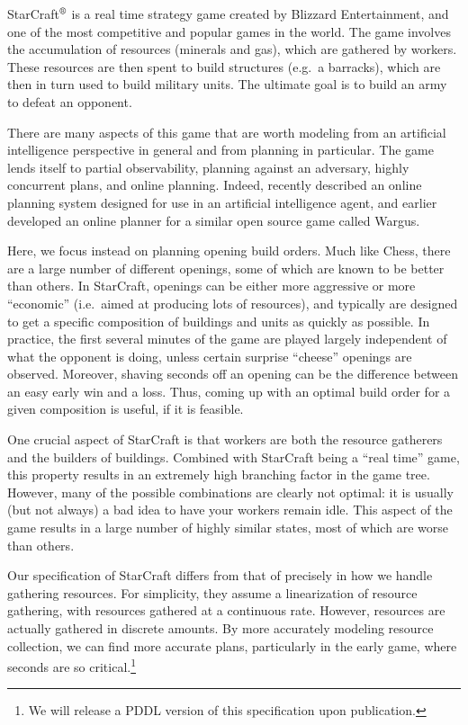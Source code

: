 \documentclass[letterpaper]{article}
\theoremstyle{plain} \newtheorem{theorem}{Theorem} \newtheorem{proposition}{Proposition} \newtheorem{lemma}{Lemma}
\theoremstyle{definition} \newtheorem{definition}{Definition} \newtheorem{conjecture}{Conjecture} \newtheorem*{example}{Example}
\theoremstyle{remark} \newtheorem*{remark}{Remark} \newtheorem*{note}{Note} \newtheorem{case}{Case}
\begin{document}
StarCraft$^\textrm{\textregistered}$ is a real time strategy game
created by Blizzard Entertainment, and one of the most competitive
and popular games in the world. The game involves the accumulation
of resources (minerals and gas), which are gathered by workers.
These resources are then spent to build structures (e.g.\ a barracks),
which are then in turn used to build military units. The ultimate goal is
to build an army to defeat an opponent.


There are many aspects of this game that are worth modeling from
an artificial intelligence perspective in general and from planning
in particular. The game lends itself to partial observability,
planning against an adversary, highly concurrent plans, and online
planning.  Indeed, \citet{churchill11build} recently described an
online planning system designed for use in an artificial intelligence
agent, and \citet{chan07online} earlier developed an online planner
for a similar open source game called Wargus.

Here, we focus instead on planning opening build orders. Much like
Chess, there are a large number of different openings, some of which
are known to be better than others. In StarCraft, openings can be
either more aggressive or more ``economic'' (i.e.\ aimed at producing
lots of resources), and typically are designed to get a specific composition
of buildings and units as quickly as possible.  In practice, the
first several minutes of the game are played largely independent
of what the opponent is doing, unless certain surprise ``cheese''
openings are observed. Moreover, shaving seconds off an opening can
be the difference between an easy early win and a loss. Thus, coming
up with an optimal build order for a given composition is useful,
if it is feasible.

One crucial aspect of StarCraft is that workers are both the resource gatherers
and the builders of buildings. Combined with StarCraft being a ``real time'' game, 
this property results in an extremely high branching factor in the game tree. However,
many of the possible combinations are clearly not optimal: it is usually (but not always) a bad idea
to have your workers remain idle. This aspect of the game results in a large number of highly similar
states, most of which are worse than others.

Our specification of StarCraft differs from that of
\citet{churchill11build} precisely in how we handle gathering
resources. For simplicity, they assume a linearization of resource
gathering, with resources gathered at a continuous rate. However,
resources are actually gathered in discrete amounts. By more
accurately modeling resource collection, we can find more
accurate plans, particularly in the early game, where seconds
are so critical.\footnote{We will release a PDDL version
of this specification upon publication.}
\end{document}
